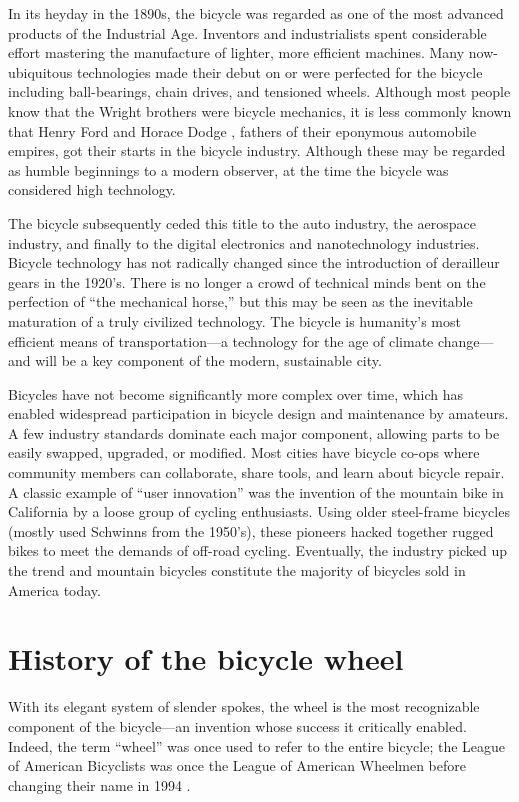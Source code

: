 \documentclass[../thesis.tex]{subfiles}
\begin{document}
In its heyday in the 1890s, the bicycle was regarded as one of the most advanced products of the Industrial Age. Inventors and industrialists spent considerable effort mastering the manufacture of lighter, more efficient machines. Many now-ubiquitous technologies made their debut on or were perfected for the bicycle including ball-bearings, chain drives, and tensioned wheels. Although most people know that the Wright brothers were bicycle mechanics, it is less commonly known that Henry Ford and Horace Dodge \cite{Reid2015}, fathers of their eponymous automobile empires, got their starts in the bicycle industry. Although these may be regarded as humble beginnings to a modern observer, at the time the bicycle was considered high technology.

The bicycle subsequently ceded this title to the auto industry, the aerospace industry, and finally to the digital electronics and nanotechnology industries. Bicycle technology has not radically changed since the introduction of derailleur gears in the 1920’s. There is no longer a crowd of technical minds bent on the perfection of ``the mechanical horse,'' but this may be seen as the inevitable maturation of a truly civilized technology. The bicycle is humanity's most efficient means of transportation---a technology for the age of climate change---and will be a key component of the modern, sustainable city.

Bicycles have not become significantly more complex over time, which has enabled widespread participation in bicycle design and maintenance by amateurs. A few industry standards dominate each major component, allowing parts to be easily swapped, upgraded, or modified. Most cities have bicycle co-ops where community members can collaborate, share tools, and learn about bicycle repair. A classic example of “user innovation” was the invention of the mountain bike in California by a loose group of cycling enthusiasts. Using older steel-frame bicycles (mostly used Schwinns from the 1950’s), these pioneers hacked together rugged bikes to meet the demands of off-road cycling. Eventually, the industry picked up the trend and mountain bicycles constitute the majority of bicycles sold in America today\cite{Crown1996}.


\section{History of the bicycle wheel}
With its elegant system of slender spokes, the wheel is the most recognizable component of the bicycle---an invention whose success it critically enabled. Indeed, the term ``wheel'' was once used to refer to the entire bicycle; the League of American Bicyclists was once the League of American Wheelmen before changing their name in 1994 .
\end{document}
